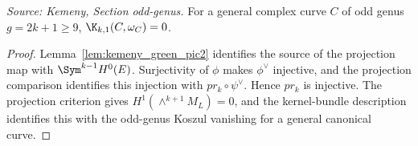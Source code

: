 \begin{theorem}
  \label{thm:kemeny_odd_voisin}
  \textit{Source: Kemeny, Section odd-genus.}
  For a general complex curve \(C\) of odd genus \(g=2k+1\ge9\),
  \(\K_{k,1}(C,\omega_C)=0\).
\end{theorem}
\begin{proof}
  Lemma~\ref{lem:kemeny_green_pic2} identifies the source of the projection map
  with \(\Sym^{k-1}H^0(E)\).  Surjectivity of \(\phi\) makes
  \(\phi^\vee\) injective, and the projection comparison identifies this
  injection with \(pr_k\circ\psi^\vee\).  Hence \(pr_k\) is injective.  The
  projection criterion gives \(H^1(\wedge^{k+1}M_L)=0\), and the kernel-bundle
  description identifies this with the odd-genus Koszul vanishing for a general
  canonical curve.
\end{proof}
